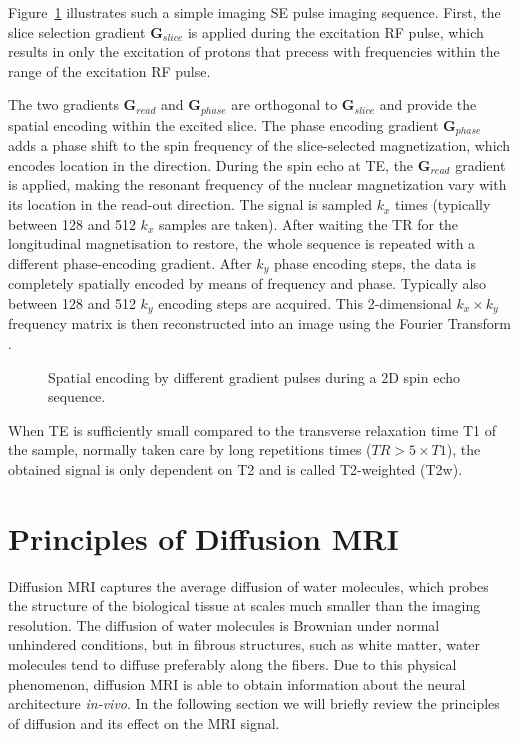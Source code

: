 Figure~\ref{fig:chapter2 SE imaging sequence} illustrates such a simple imaging SE pulse imaging sequence. First, the slice selection gradient $\textbf{G}_{slice}$ is applied during the excitation RF pulse, which results in only the excitation of protons that precess with frequencies within the range of the excitation RF pulse. 

The two gradients $\textbf{G}_{read}$ and $\textbf{G}_{phase}$ are orthogonal to $\textbf{G}_{slice}$ and provide the spatial encoding within the excited slice. The phase encoding gradient $\textbf{G}_{phase}$ adds a phase shift to the spin frequency of the slice-selected magnetization, which encodes location in the  direction. During the spin echo at TE, the $\textbf{G}_{read}$ gradient is applied, making the resonant frequency of the nuclear magnetization vary with its location in the read-out direction. The signal is sampled $k_x$ times (typically between 128 and 512 $k_x$ samples are taken).
After waiting the \gls{TR} for the longitudinal magnetisation to restore, the whole sequence is repeated with a different phase-encoding gradient. After $k_y$ phase encoding steps, the data is completely spatially encoded by means of frequency and phase. Typically also between 128 and 512 $k_y$ encoding steps are acquired. This 2-dimensional $k_x\times k_y$ frequency matrix is then reconstructed into an image using the Fourier Transform \citep{Ljunggren:1983,Twieg:1983}.
\begin{figure}[ht]
\centering
{}
\caption{Spatial encoding by different gradient pulses during a 2D spin echo sequence.}
\label{fig:chapter2 SE imaging sequence}
\end{figure}

When TE is sufficiently small compared to the transverse relaxation time T1 of the sample, normally taken care by long repetitions times ($TR>5\times T1 $), the obtained signal is only dependent on T2 and is called T2-weighted (T2w). 



\section{Principles of Diffusion MRI}
Diffusion MRI captures the average diffusion of water molecules, which probes the structure of the biological tissue at scales much smaller than the imaging resolution. The diffusion of water molecules is Brownian under normal unhindered conditions, but in fibrous structures, such as white matter, water molecules tend to diffuse preferably along the fibers. Due to this physical phenomenon, diffusion MRI is able to obtain information about the neural architecture \textit{in-vivo}. In the following section we will briefly review the principles of diffusion and its effect on the MRI signal.

